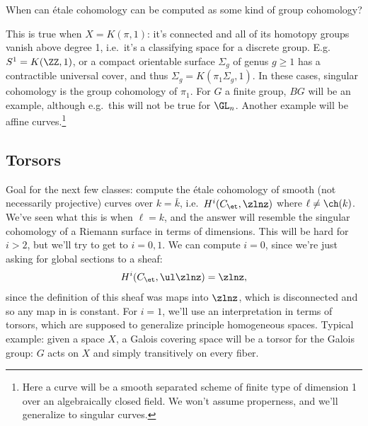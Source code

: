 \begin{question}

When can étale cohomology can be computed as some kind of group
cohomology?

\end{question}

\begin{answer}

This is true when \(X = K(\pi, 1)\): it's connected and all of its
homotopy groups vanish above degree 1, i.e.~it's a classifying space for
a discrete group. E.g. \(S^1 = K(\ZZ, 1)\), or a compact orientable
surface \(\Sigma_g\) of genus \(g\geq 1\) has a contractible universal
cover, and thus \(\Sigma_g = K(\pi_1 \Sigma_g, 1)\). In these cases,
singular cohomology is the group cohomology of \(\pi_1\). For \(G\) a
finite group, \(BG\) will be an example, although e.g.~this will not be
true for \(\GL_n\). Another example will be affine curves.\footnote{Here
  a curve will be a smooth separated scheme of finite type of dimension
  1 over an algebraically closed field. We won't assume properness, and
  we'll generalize to singular curves.}

\end{answer}

\hypertarget{torsors}{%
\subsection{Torsors}\label{torsors}}

Goal for the next few classes: compute the étale cohomology of smooth
(not necessarily projective) curves over \(k=\bar k\),
i.e.~\(H^i(C_\et, \zlnz)\) where \(\ell \neq \ch(k)\). We've seen what
this is when \(\ell = k\), and the answer will resemble the singular
cohomology of a Riemann surface in terms of dimensions. This will be
hard for \(i>2\), but we'll try to get to \(i=0, 1\). We can compute
\(i=0\), since we're just asking for global sections to a sheaf:
\begin{align*}  
H^i (C_\et, \ul\zlnz) = \zlnz
,\end{align*} since the definition of this sheaf was maps into
\(\zlnz\), which is disconnected and so any map in is constant. For
\(i=1\), we'll use an interpretation in terms of torsors, which are
supposed to generalize principle homogeneous spaces. Typical example:
given a space \(X\), a Galois covering space will be a torsor for the
Galois group: \(G\) acts on \(X\) and simply transitively on every
fiber.

